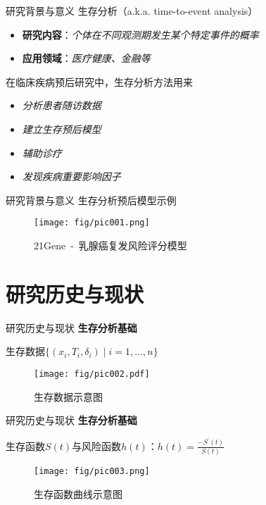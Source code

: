 \documentclass[10pt]{beamer}
\begin{document}
\begin{frame}{研究背景与意义}
  生存分析（a.k.a. time-to-event analysis）
  \begin{itemize}
    \item \textbf{研究内容}：\textit{个体在不同观测期发生某个特定事件的概率}
    \item \textbf{应用领域}：\textit{医疗健康、金融等}
  \end{itemize}

  在临床疾病预后研究中，生存分析方法用来
  \begin{itemize}
    \item \textit{分析患者随访数据}
    \item \textit{建立生存预后模型}
    \item \textit{辅助诊疗}
    \item \textit{发现疾病重要影响因子}
  \end{itemize}
\end{frame}

\begin{frame}{研究背景与意义}
  生存分析预后模型示例
  \begin{figure}[H]
    \centering
    \texttt{[image: fig/pic001.png]}
    \caption{21Gene\ -\ 乳腺癌复发风险评分模型}
  \end{figure}
\end{frame}

\section{研究历史与现状}

\begin{frame}{研究历史与现状}
  \textbf{生存分析基础}
  
  生存数据$\{(x_i,T_i,\delta_i ) \mid i=1,\dots,n\}$
  \begin{figure}[H]
    \centering
    \texttt{[image: fig/pic002.pdf]}
    \caption{生存数据示意图}
  \end{figure}
\end{frame}

\begin{frame}{研究历史与现状}
  \textbf{生存分析基础}
  
  生存函数$S(t)$与风险函数$h(t)$：$h(t)=\frac{-S^{'}(t)}{S(t)}$
  \begin{figure}[H]
    \centering
    \texttt{[image: fig/pic003.png]}
    \caption{生存函数曲线示意图}
  \end{figure}
\end{frame}
\end{document}
